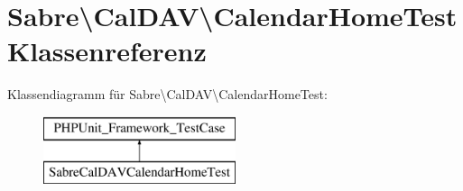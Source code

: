 \hypertarget{class_sabre_1_1_cal_d_a_v_1_1_calendar_home_test}{}\section{Sabre\textbackslash{}Cal\+D\+AV\textbackslash{}Calendar\+Home\+Test Klassenreferenz}
\label{class_sabre_1_1_cal_d_a_v_1_1_calendar_home_test}
Klassendiagramm für Sabre\textbackslash{}Cal\+D\+AV\textbackslash{}Calendar\+Home\+Test\+:\begin{figure}[H]
\begin{center}
\leavevmode
\includegraphics[height=2.000000cm]{class_sabre_1_1_cal_d_a_v_1_1_calendar_home_test}
\end{center}
\end{figure}
